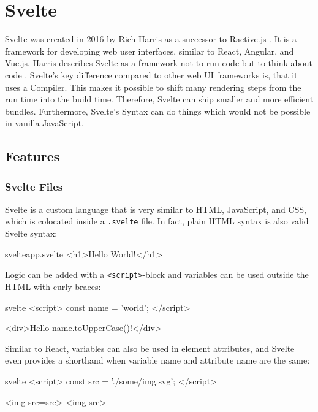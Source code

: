 \section{Svelte}
\label{sec:svelte}

Svelte was created in 2016 by Rich Harris as a successor to Ractive.js \cite{offerzen_origins_svelte_2022}. It is a framework for developing web user interfaces, similar to React, Angular, and Vue.js. Harris describes Svelte as a framework not to run code but to think about code \cite{offerzen_origins_svelte_2022}. Svelte's key difference compared to other web UI frameworks is, that it uses a Compiler. This makes it possible to shift many rendering steps from the run time into the build time. Therefore, Svelte can ship smaller and more efficient bundles. Furthermore, Svelte's Syntax can do things which would not be possible in vanilla JavaScript.

\subsection{Features}

\subsubsection{Svelte Files}

Svelte is a custom language that is very similar to HTML, JavaScript, and CSS, which is colocated inside a \texttt{.svelte} file. In fact, plain HTML syntax is also valid Svelte syntax:

\begin{myminted}{svelte}{app.svelte}
<h1>Hello World!</h1> 
\end{myminted}

Logic can be added with a \texttt{<script>}-block and variables can be used outside the HTML with curly-braces:

\begin{myminted}{svelte}{}
<script>
    const name = 'world';
</script>

<div>Hello {name.toUpperCase()}!</div>
\end{myminted}

Similar to React, variables can also be used in element attributes, and Svelte even provides a shorthand when variable name and attribute name are the same:
\begin{myminted}{svelte}{}
<script>
    const src = './some/img.svg';
</script>

<img src={src}>
<img {src}> 
\end{myminted}

